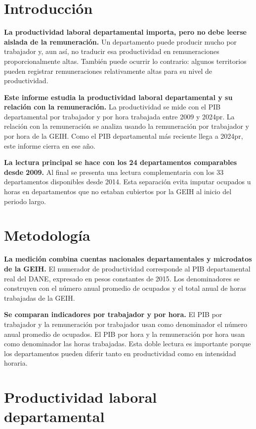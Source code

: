 \section{Introducción}

\textbf{La productividad laboral departamental importa, pero no debe leerse aislada de la remuneración.} Un departamento puede producir mucho por trabajador y, aun así, no traducir esa productividad en remuneraciones proporcionalmente altas. También puede ocurrir lo contrario: algunos territorios pueden registrar remuneraciones relativamente altas para su nivel de productividad.

\textbf{Este informe estudia la productividad laboral departamental y su relación con la remuneración.} La productividad se mide con el PIB departamental por trabajador y por hora trabajada entre 2009 y 2024pr. La relación con la remuneración se analiza usando la remuneración por trabajador y por hora de la GEIH. Como el PIB departamental más reciente llega a 2024pr, este informe cierra en ese año.

\textbf{La lectura principal se hace con los 24 departamentos comparables desde 2009.} Al final se presenta una lectura complementaria con los 33 departamentos disponibles desde 2014. Esta separación evita imputar ocupados u horas en departamentos que no estaban cubiertos por la GEIH al inicio del periodo largo.

\section{Metodología}

\textbf{La medición combina cuentas nacionales departamentales y microdatos de la GEIH.} El numerador de productividad corresponde al PIB departamental real del DANE, expresado en pesos constantes de 2015. Los denominadores se construyen con el número anual promedio de ocupados y el total anual de horas trabajadas de la GEIH.

\textbf{Se comparan indicadores por trabajador y por hora.} El PIB por trabajador y la remuneración por trabajador usan como denominador el número anual promedio de ocupados. El PIB por hora y la remuneración por hora usan como denominador las horas trabajadas. Esta doble lectura es importante porque los departamentos pueden diferir tanto en productividad como en intensidad horaria.

\section{Productividad laboral departamental}

